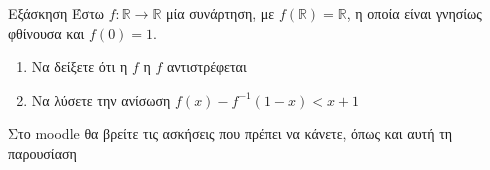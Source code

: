\documentclass[greek]{beamer}
\begin{document}
\begin{frame}{Εξάσκηση}
 Έστω $f:\mathbb{R}\to\mathbb{R}$ μία συνάρτηση, με $f(\mathbb{R})=\mathbb{R}$, η οποία είναι γνησίως φθίνουσα και $f(0)=1$.
 \begin{enumerate}
  \item Να δείξετε ότι η $f$ η $f$ αντιστρέφεται \pause
  \item Να λύσετε την ανίσωση $f(x)-f^{-1}(1-x)<x+1$
 \end{enumerate}
\end{frame}

\begin{frame}
 Στο moodle θα βρείτε τις ασκήσεις που πρέπει να κάνετε, όπως και αυτή τη παρουσίαση
\end{frame}
\end{document}
